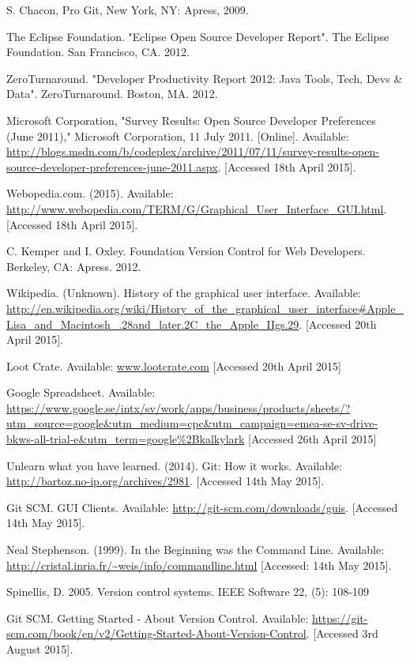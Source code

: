\documentclass[a4paper,oneside]{bth} %
\begin{document}
\begin{thebibliography}{1}
			S. Chacon, Pro Git, New York, NY: Apress, 2009.
			
			The Eclipse Foundation. "Eclipse Open Source Developer Report". The Eclipse Foundation. San Francisco, CA. 2012.
			
			ZeroTurnaround. "Developer Productivity Report 2012: Java Tools, Tech, Devs \& Data". ZeroTurnaround. Boston, MA. 2012.
			
			Microsoft Corporation, "Survey Results: Open Source Developer Preferences (June 2011)," Microsoft Corporation, 11 July 2011. [Online]. Available: \url{http://blogs.msdn.com/b/codeplex/archive/2011/07/11/survey-results-open-source-developer-preferences-june-2011.aspx}. [Accessed 18th April 2015].
			
			Webopedia.com. (2015). Available: \url{http://www.webopedia.com/TERM/G/Graphical\_User\_Interface\_GUI.html}. [Accessed 18th April 2015].
			
			C. Kemper and I. Oxley. Foundation Version Control for Web Developers. Berkeley, CA: Apress. 2012.
			
			Wikipedia. (Unknown). History of the graphical user interface. Available: \url{http://en.wikipedia.org/wiki/History_of_the_graphical_user_interface#Apple_Lisa_and_Macintosh_.28and_later.2C_the_Apple_IIgs.29}.  [Accessed 20th April 2015].
			
			Loot Crate. Available: \url{www.lootcrate.com} [Accessed 20th April 2015]
			
			Google Spreadsheet. Available: \url{https://www.google.se/intx/sv/work/apps/business/products/sheets/?utm_source=google&utm_medium=cpc&utm_campaign=emea-se-sv-drive-bkws-all-trial-e&utm_term=google%2Bkalkylark} [Accessed 26th April 2015]
			
			Unlearn what you have learned. (2014). Git: How it works. Available: \url{http://bartoz.no-ip.org/archives/2981}. [Accessed 14th May 2015].
			
			Git SCM. GUI Clients. Available: \url{http://git-scm.com/downloads/guis}. [Accessed 14th May 2015].
			
			Neal Stephenson. (1999). In the Beginning was the Command Line. Available: \url{http://cristal.inria.fr/~weis/info/commandline.html}	[Accessed: 14th May 2015].
			
			Spinellis, D. 2005. Version control systems. IEEE Software 22, (5): 108-109	
			
			Git SCM. Getting Started - About Version Control. Available: \url{https://git-scm.com/book/en/v2/Getting-Started-About-Version-Control}. [Accessed 3rd August 2015].
			
		\end{thebibliography}
\end{document}
